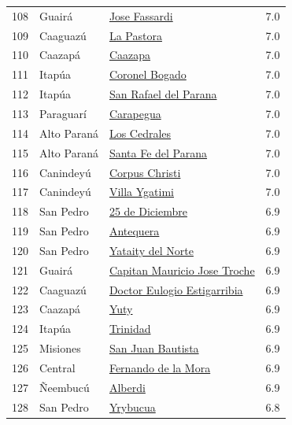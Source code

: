 {\begin{longtable}[]{@{}llll@{}}
108 & Guairá & \hyperref[dist:04_Guaira:Jose_Fassardi]{Jose Fassardi} & 7.0 \\
109 & Caaguazú & \hyperref[dist:05_Caaguazu:La_Pastora]{La Pastora} & 7.0 \\
110 & Caazapá & \hyperref[dist:06_Caazapa:Caazapa]{Caazapa} & 7.0 \\
111 & Itapúa & \hyperref[dist:07_Itapua:Coronel_Bogado]{Coronel Bogado} & 7.0 \\
112 & Itapúa & \hyperref[dist:07_Itapua:San_Rafael_del_Parana]{San Rafael del Parana} & 7.0 \\
113 & Paraguarí & \hyperref[dist:09_Paraguari:Carapegua]{Carapegua} & 7.0 \\
114 & Alto Paraná & \hyperref[dist:10_Alto_Parana:Los_Cedrales]{Los Cedrales} & 7.0 \\
115 & Alto Paraná & \hyperref[dist:10_Alto_Parana:Santa_Fe_del_Parana]{Santa Fe del Parana} & 7.0 \\
116 & Canindeyú & \hyperref[dist:14_Canindeyu:Corpus_Christi]{Corpus Christi} & 7.0 \\
117 & Canindeyú & \hyperref[dist:14_Canindeyu:Villa_Ygatimi]{Villa Ygatimi} & 7.0 \\
118 & San Pedro & \hyperref[dist:02_San_Pedro:25_de_Diciembre]{25 de Diciembre} & 6.9 \\
119 & San Pedro & \hyperref[dist:02_San_Pedro:Antequera]{Antequera} & 6.9 \\
120 & San Pedro & \hyperref[dist:02_San_Pedro:Yataity_del_Norte]{Yataity del Norte} & 6.9 \\
121 & Guairá & \hyperref[dist:04_Guaira:Capitan_Mauricio_Jose_Troche]{Capitan Mauricio Jose Troche} & 6.9 \\
122 & Caaguazú & \hyperref[dist:05_Caaguazu:Doctor_Eulogio_Estigarribia]{Doctor Eulogio Estigarribia} & 6.9 \\
123 & Caazapá & \hyperref[dist:06_Caazapa:Yuty]{Yuty} & 6.9 \\
124 & Itapúa & \hyperref[dist:07_Itapua:Trinidad]{Trinidad} & 6.9 \\
125 & Misiones & \hyperref[dist:08_Misiones:San_Juan_Bautista]{San Juan Bautista} & 6.9 \\
126 & Central & \hyperref[dist:11_Central:Fernando_de_la_Mora]{Fernando de la Mora} & 6.9 \\
127 & Ñeembucú & \hyperref[dist:12_Neembucu:Alberdi]{Alberdi} & 6.9 \\
128 & San Pedro & \hyperref[dist:02_San_Pedro:Yrybucua]{Yrybucua} & 6.8 \\

\end{longtable}}
